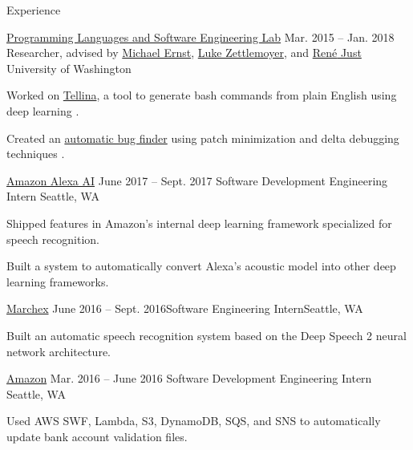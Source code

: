 \documentclass{resume}
\begin{document}
\begin{rSection}{Experience}
  \begin{rSubsection}{\href{https://uwplse.org/}
                           {Programming Languages and Software Engineering Lab}}
                     {Mar. 2015 -- Jan. 2018}
                     {Researcher, advised by
                       \href{https://homes.cs.washington.edu/~mernst/}
                            {Michael Ernst},
                       \href{https://www.cs.washington.edu/people/faculty/lsz}
                            {Luke Zettlemoyer},
                       and \href{https://people.cs.umass.edu/~rjust/}
                                {Ren{\'e} Just}}
                     {University of Washington}
  \item Worked on \href{https://github.com/TellinaTool}{Tellina}, a tool
    to generate bash commands from plain English using deep learning \citep{LinWPVZE2017:TR}.
  \item Created an \href{https://github.com/pderichai/patch-minimization}
                        {automatic bug finder}
    using patch minimization and delta debugging techniques
    \citep{Pearson:2017:EIF:3097368.3097441}.
  \end{rSubsection}
  
  \begin{rSubsection}{\href{https://www.amazon.jobs/en/teams/alexa-ai/}
                           {Amazon Alexa AI}}
                     {June 2017 -- Sept. 2017}
                     {Software Development Engineering Intern}
                     {Seattle, WA}
    \item Shipped features in Amazon's internal deep learning framework
      specialized for speech recognition.
    \item Built a system to automatically convert Alexa's acoustic model into
      other deep learning frameworks.
  \end{rSubsection}

  \begin{rSubsection}{\href{http://www.marchex.com/}{Marchex}}
    {June 2016 -- Sept. 2016}{Software Engineering Intern}{Seattle, WA}
  \item Built an automatic speech recognition system based on the Deep Speech 2
    neural network architecture.
  \end{rSubsection}

  \begin{rSubsection}{\href{https://www.amazon.com/}{Amazon}}
                     {Mar. 2016 -- June 2016}
                     {Software Development Engineering Intern}
                     {Seattle, WA}
  \item Used AWS SWF, Lambda, S3, DynamoDB, SQS, and SNS to automatically update
    bank account validation files.
  \end{rSubsection}

\end{rSection}
\end{document}
